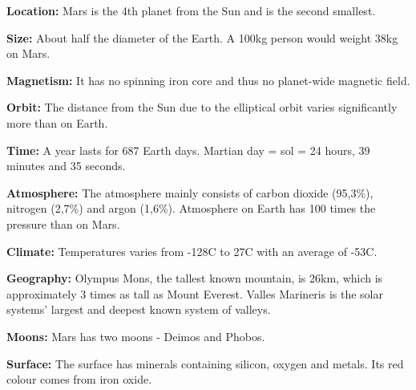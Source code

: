 \begin{tcolorbox}[colback=red!5,colframe=DarkRed!40!black,title=Mars: 10 facts about the red planet]
\textbf{Location:} Mars is the 4th planet from the Sun and is the second smallest.

\textbf{Size:} About half the diameter of the Earth. A 100kg person would weight 38kg on Mars.

\textbf{Magnetism:} It has no spinning iron core and thus no planet-wide magnetic field.

\textbf{Orbit:} The distance from the Sun due to the elliptical orbit varies significantly more than on Earth.

\textbf{Time:} A year lasts for 687 Earth days. Martian day = sol = 24 hours, 39 minutes and 35 seconds.

\textbf{Atmosphere:} The atmosphere mainly consists of carbon dioxide (95,3\%), nitrogen (2,7\%) and argon (1,6\%).
Atmosphere on Earth has 100 times the pressure than on Mars.

\textbf{Climate:} Temperatures varies from -128C to 27C with an average of -53C.

\textbf{Geography:} Olympus Mons, the tallest known mountain, is 26km, which is approximately 3 times as tall as Mount Everest.
Valles Marineris is the solar systems' largest and deepest known system of valleys.

\textbf{Moons:} Mars has two moons - Deimos and Phobos.

\textbf{Surface:} The surface has minerals containing silicon, oxygen and metals. Its red colour comes from iron oxide.
\end{tcolorbox}